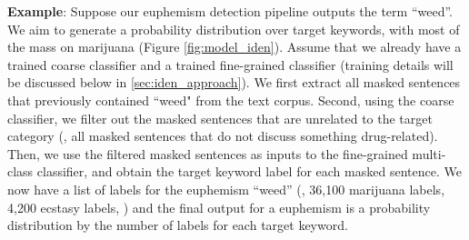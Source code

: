 \noindent \textbf{Example}: 
Suppose our euphemism detection pipeline outputs the term ``weed''. 
We aim to generate a probability distribution over target keywords, with most of the mass on marijuana (Figure \ref{fig:model_iden}). 
Assume that we already have a trained coarse classifier and a trained fine-grained classifier (training details will be discussed below in \ref{sec:iden_approach}). 
We first extract all  masked sentences that previously contained ``weed" from the text corpus. 
Second, using the coarse classifier, 
we filter out the masked sentences that are unrelated to the target category (\ie, all masked sentences that do not discuss something drug-related). 
Then, we use the filtered masked sentences as inputs to the fine-grained multi-class classifier, and obtain the target keyword label for each masked sentence. 
We now have a list of labels for the euphemism ``weed'' (\eg, 36,100 marijuana labels, 4,200 ecstasy labels, \etc) and the final output for a euphemism is a probability distribution by the number of labels for each target keyword. 




